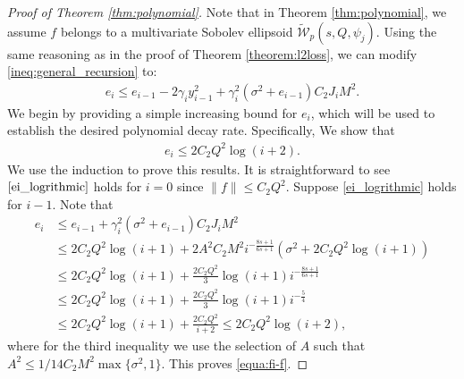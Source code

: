 \begin{proof}[Proof of Theorem \ref{thm:polynomial}]
Note that in Theorem \ref{thm:polynomial}, we assume $f$ belongs to a multivariate Sobolev ellipsoid $\tilde{\mathcal{W}}_p(s,Q, {\psi_j})$. Using the same reasoning as in the proof of Theorem \ref{theorem:l2loss}, we can modify \eqref{ineq:general_recursion} to:
\begin{align}
    e_i \leq e_{i-1} - 2\gamma_iy_{i-1}^2 + \gamma_i^2\left(\sigma^2 + e_{i-1}\right)C_2J_iM^2. \label{ineq:recur1}
\end{align}
We begin by providing a simple increasing bound for $e_i$, which will be used to establish the desired polynomial decay rate. Specifically, We  show that 
\begin{align}
    e_i \leq 2C_2Q^2\log(i+2). \label{ei_logrithmic}
\end{align}
We use the induction to prove this results. It is straightforward to see $\eqref{ei_logrithmic}$ holds for $i=0$ since $\|f\| \leq C_2Q^2$. Suppose \eqref{ei_logrithmic} holds for $i-1$. Note that 
\begin{align}
    e_i &\leq e_{i-1} + \gamma_i^2\left(\sigma^2 + e_{i-1}\right)C_2J_iM^2\\
    & \leq 2C_2Q^2\log(i+1) + 2A^2C_2M^2i^{-\frac{8s+1}{6s+1}}(\sigma^2 + 2C_2Q^2\log(i+1))\\
    & \leq 2C_2Q^2\log(i+1) + \frac{2C_2Q^2}{3}\log(i+1)i^{-\frac{8s+1}{6s+1}}\\
    & \leq 2C_2Q^2\log(i+1) + \frac{2C_2Q^2}{3}\log(i+1)i^{-\frac{5}{4}}\\
    & \leq 2C_2Q^2\log(i+1) + \frac{2C_2Q^2}{i+2} \leq 2C_2Q^2\log(i+2),
\end{align}
where for the third inequality we use the selection of $A$ such that $A^2 \leq 1/14C_2M^2\max\{\sigma^2, 1\}$. This proves \eqref{equa:fi-f}.


\end{proof}
